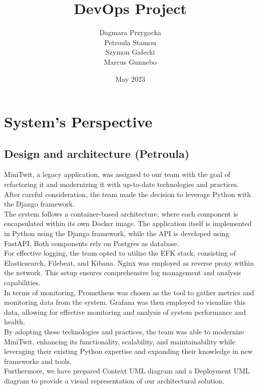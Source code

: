 \documentclass{article}
\title{DevOps Project}
\author{Dagmara Przygocka\\Petroula Stamou
\\Szymon Gałecki\\Marcus Gunnebo}
\date{May 2023}
\begin{document}
\maketitle

\section{System's Perspective}
    \subsection{Design and architecture (Petroula)}
        MiniTwit, a legacy application, was assigned to our team with the goal of refactoring it and modernizing it with up-to-date technologies and practices. After careful consideration, the team made the decision to leverage Python with the Django framework. \\
        The system follows a container-based architecture, where each component is encapsulated within its own Docker image. The application itself is implemented in Python using the Django framework, while the API is developed using FastAPI. Both components rely on Postgres as database.\\
        For effective logging, the team opted to utilize the EFK stack, consisting of Elasticsearch, Filebeat, and Kibana. Nginx was employed as reverse proxy within the network. This setup ensures comprehensive log management and analysis capabilities.\\
        In terms of monitoring, Prometheus was chosen as the tool to gather metrics and monitoring data from the system. Grafana was then employed to visualize this data, allowing for effective monitoring and analysis of system performance and health.\\
        By adopting these technologies and practices, the team was able to modernize MiniTwit, enhancing its functionality, scalability, and maintainability while leveraging their existing Python expertise and expanding their knowledge in new frameworks and tools. \\
        Furthermore, we have prepared Context UML diagram and a Deployment UML diagram to provide a visual representation of our architectural solution.
\end{document}
